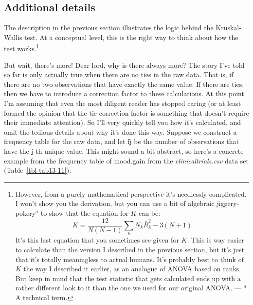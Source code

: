 \documentclass[
  a4paper,
]{book}
\begin{document}
\hypertarget{additional-details}{%
\subsection{Additional details}\label{additional-details}}

The description in the previous section illustrates the logic behind the
Kruskal-Wallis test. At a conceptual level, this is the right way to
think about how the test works.\footnote{However, from a purely
  mathematical perspective it's needlessly complicated. I won't show you
  the derivation, but you can use a bit of algebraic
  jiggery-pokery\(^a\) to show that the equation for \(K\) can be:
  \[K=\frac{12}{N(N-1)}\sum_k N_k \bar{R}_k^2 -3(N+1)\] It's this last
  equation that you sometimes see given for \(K\). This is way easier to
  calculate than the version I described in the previous section, but
  it's just that it's totally meaningless to actual humans. It's
  probably best to think of \(K\) the way I described it earlier, as an
  analogue of ANOVA based on ranks. But keep in mind that the test
  statistic that gets calculated ends up with a rather different look to
  it than the one we used for our original ANOVA. --- \(^a\)A technical
  term.}

But wait, there's more! Dear lord, why is there always more? The story
I've told so far is only actually true when there are no ties in the raw
data. That is, if there are no two observations that have exactly the
same value. If there are ties, then we have to introduce a correction
factor to these calculations. At this point I'm assuming that even the
most diligent reader has stopped caring (or at least formed the opinion
that the tie-correction factor is something that doesn't require their
immediate attention). So I'll very quickly tell you how it's calculated,
and omit the tedious details about why it's done this way. Suppose we
construct a frequency table for the raw data, and let fj be the number
of observations that have the j-th unique value. This might sound a bit
abstract, so here's a concrete example from the frequency table of
mood.gain from the \emph{clinicaltrials.csv} data set
(Table~\ref{tbl-tab13-11}).

\hypertarget{tbl-tab13-11}{}
 
  \providecommand{\huxb}[2]{\arrayrulecolor[RGB]{#1}\global\arrayrulewidth=#2pt}
  \providecommand{\huxvb}[2]{\color[RGB]{#1}\vrule width #2pt}
  \providecommand{\huxtpad}[1]{\rule{0pt}{#1}}
  \providecommand{\huxbpad}[1]{\rule[-#1]{0pt}{#1}}
\end{document}
